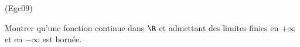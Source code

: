 \begin{tiny}(Egc09)\end{tiny}
Montrer qu'une fonction continue dans $\R$ et admettant des limites finies en $+\infty$ et en $-\infty$ est bornée.